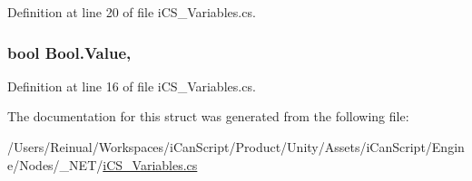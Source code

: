 Definition at line 20 of file i\+C\+S\+\_\+\+Variables.\+cs.

\hypertarget{struct_bool_a70bc573da6ea3bb93da5de3e442ada19}{
\subsubsection[{Value}]{\setlength{\rightskip}{0pt plus 5cm}bool Bool.\+Value\hspace{0.3cm}{\ttfamily [get]}, {\ttfamily [set]}}}\label{struct_bool_a70bc573da6ea3bb93da5de3e442ada19}


Definition at line 16 of file i\+C\+S\+\_\+\+Variables.\+cs.



The documentation for this struct was generated from the following file\+:\begin{DoxyCompactItemize}
\item 
/\+Users/\+Reinual/\+Workspaces/i\+Can\+Script/\+Product/\+Unity/\+Assets/i\+Can\+Script/\+Engine/\+Nodes/\+\_\+\+N\+E\+T/\hyperlink{i_c_s___variables_8cs}{i\+C\+S\+\_\+\+Variables.\+cs}\end{DoxyCompactItemize}
